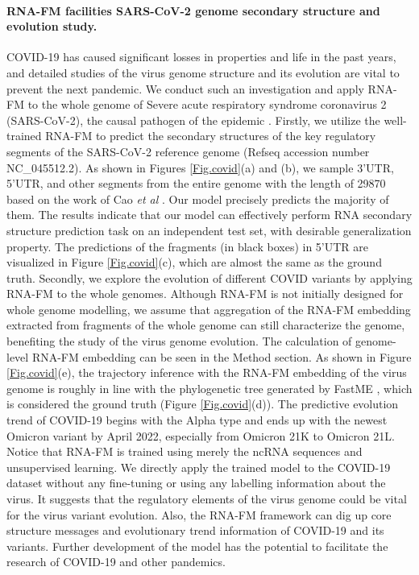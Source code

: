 
\paragraph{RNA-FM facilities SARS-CoV-2 genome secondary structure and evolution study.}
COVID-19 has caused significant losses in properties and life in the past years, and detailed studies of the virus genome structure and its evolution are vital to prevent the next pandemic. We conduct such an investigation and apply RNA-FM to the whole genome of Severe acute respiratory syndrome coronavirus 2 (SARS-CoV-2), the causal pathogen of the epidemic \cite{wu2020new}.
Firstly, we utilize the well-trained RNA-FM to predict the secondary structures of the key regulatory segments of the SARS-CoV-2 reference genome (Refseq accession number NC\_045512.2). As shown in Figures \ref{Fig.covid}(a) and (b), we sample 3'UTR, 5'UTR, and other segments from the entire genome with the length of 29870 based on the work of Cao \textit{et al} \cite{cao2021architecture}. Our model precisely predicts the majority of them. The results indicate that our model can effectively perform RNA secondary structure prediction task on an independent test set, with desirable generalization property. The predictions of the fragments (in black boxes) in 5'UTR are visualized in Figure \ref{Fig.covid}(c), which are almost the same as the ground truth.
Secondly, we explore the evolution of different COVID variants by applying RNA-FM to the whole genomes. Although RNA-FM is not initially designed for whole genome modelling, we assume that aggregation of the RNA-FM embedding extracted from fragments of the whole genome can still characterize the genome, benefiting the study of the virus genome evolution. The calculation of genome-level RNA-FM embedding can be seen in the Method section. As shown in Figure \ref{Fig.covid}(e), the trajectory inference with the RNA-FM embedding of the virus genome is roughly in line with the phylogenetic tree generated by FastME \cite{desper2002fast}, which is considered the ground truth (Figure \ref{Fig.covid}(d)). The predictive evolution trend of COVID-19 begins with the Alpha type and ends up with the newest Omicron variant by April 2022, especially from Omicron 21K to Omicron 21L. 
Notice that RNA-FM is trained using merely the ncRNA sequences and unsupervised learning. We directly apply the trained model to the COVID-19 dataset without any fine-tuning or using any labelling information about the virus. It suggests that the regulatory elements of the virus genome could be vital for the virus variant evolution. Also, the RNA-FM framework can dig up core structure messages and evolutionary trend information of COVID-19 and its variants. Further development of the model has the potential to facilitate the research of COVID-19 and other pandemics.


